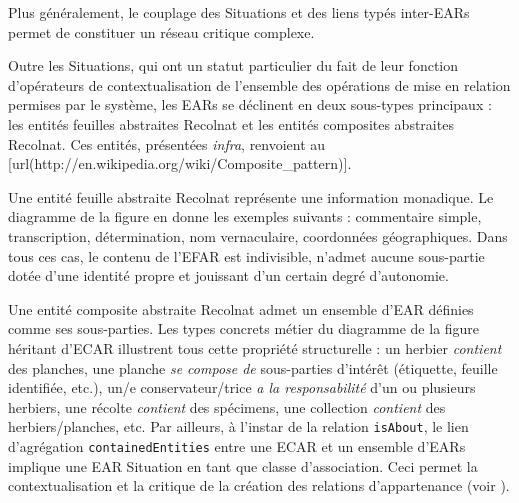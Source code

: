 Plus généralement, le couplage des Situations et des liens typés inter-EARs permet de constituer un réseau critique complexe.

\stopsection
\startsection[title={Sous-types d'EARs}]

Outre les Situations, qui ont un statut particulier du fait de leur fonction d'opérateurs de contextualisation de l'ensemble des opérations de mise en relation permises par le système, les EARs se déclinent en deux sous-types principaux : les entités feuilles abstraites Recolnat et les entités composites abstraites Recolnat.
Ces entités, présentées {\it infra}, renvoient au [url(http://en.wikipedia.org/wiki/Composite_pattern)].

\startsubsection[title={Entité feuille abstraite Recolnat (EFAR)}]

Une entité feuille abstraite Recolnat représente une information monadique.
Le diagramme de la figure  en donne les exemples suivants : commentaire simple, transcription, détermination, nom vernaculaire, coordonnées géographiques.
Dans tous ces cas, le contenu de l'EFAR est indivisible, n'admet aucune sous-partie dotée d'une identité propre et jouissant d'un certain degré d'autonomie.

\stopsubsection
\startsubsection[title={Entité composite abstraite Recolnat (ECAR)}]

Une entité composite abstraite Recolnat admet un ensemble d'EAR définies comme ses sous-parties.
Les types concrets métier du diagramme de la figure  héritant d'ECAR illustrent tous cette propriété structurelle : un herbier {\it contient} des planches, une planche {\it se compose de} sous-parties d'intérêt (étiquette, feuille identifiée, etc.), un/e conservateur/trice {\it a la responsabilité} d'un ou plusieurs herbiers, une récolte {\it contient} des spécimens, une collection {\it contient} des herbiers/planches, etc.
Par ailleurs, à l'instar de la relation {\tt isAbout}, le lien d'agrégation {\tt containedEntities} entre une ECAR et un ensemble d'EARs implique une EAR Situation en tant que classe d'association.
Ceci permet la contextualisation et la critique de la création des relations d'appartenance (voir ).

\stopsubsection
\stopsection
\stopchapter